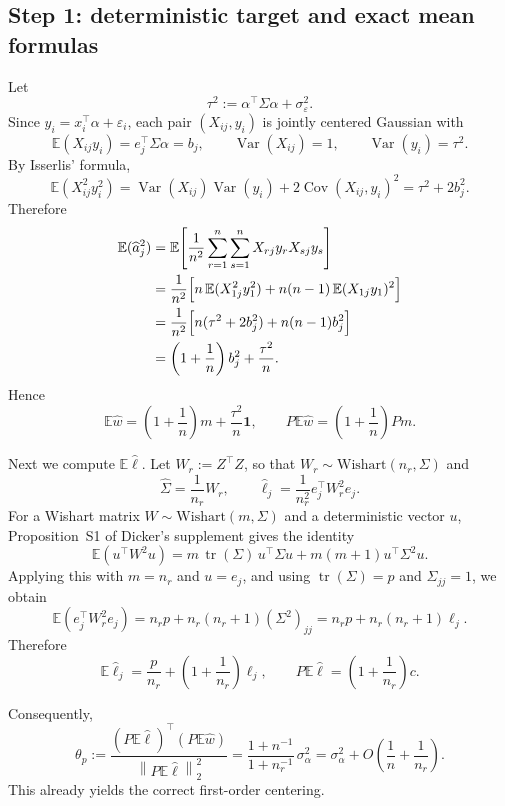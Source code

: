 \documentclass[11pt]{article}
\theoremstyle{definition}
\newcommand{\E}{\mathbb{E}}
\newcommand{\Var}{\operatorname{Var}}
\newcommand{\Cov}{\operatorname{Cov}}
\newcommand{\tr}{\operatorname{tr}}
\newcommand{\1}{\mathbf{1}}
\newcommand{\norm}[1]{\left\lVert #1 \right\rVert}
\begin{document}
\subsection*{Step 1: deterministic target and exact mean formulas}

Let
\[
 \tau^2:=\alpha^\top\Sigma\alpha+\sigma_\varepsilon^2.
\]
Since $y_i=x_i^\top\alpha+\varepsilon_i$, each pair $(X_{ij},y_i)$ is jointly centered Gaussian with
\[
 \E(X_{ij}y_i)=e_j^\top\Sigma\alpha=b_j,
 \qquad
 \Var(X_{ij})=1,
 \qquad
 \Var(y_i)=\tau^2.
\]
By Isserlis' formula,
\[
 \E(X_{ij}^2y_i^2)=\Var(X_{ij})\Var(y_i)+2\Cov(X_{ij},y_i)^2
 =\tau^2+2b_j^2.
\]
Therefore
\begin{align*}
 \E(\widehat a_j^2)
 &=\E\Biggl[\frac1{n^2}\sum_{r=1}^n\sum_{s=1}^n X_{rj}y_rX_{sj}y_s\Biggr] \\
 &=\frac1{n^2}\Bigl[n\,\E(X_{1j}^2y_1^2)+n(n-1)\,\E(X_{1j}y_1)^2\Bigr] \\
 &=\frac1{n^2}\Bigl[n(\tau^2+2b_j^2)+n(n-1)b_j^2\Bigr] \\
 &=\left(1+\frac1n\right)b_j^2+\frac{\tau^2}{n}.
\end{align*}
Hence
\begin{equation}\label{eq:Ew}
 \E\widehat w=\left(1+\frac1n\right)m+\frac{\tau^2}{n}\1,
 \qquad
 P\E\widehat w=\left(1+\frac1n\right)Pm.
\end{equation}

Next we compute $\E\widehat\ell$. Let $W_r:=Z^\top Z$, so that $W_r\sim \mathrm{Wishart}(n_r,\Sigma)$ and
\[
 \widehat\Sigma=\frac1{n_r}W_r,
 \qquad
 \widehat\ell_j=\frac1{n_r^2}e_j^\top W_r^2e_j.
\]
For a Wishart matrix $W\sim\mathrm{Wishart}(m,\Sigma)$ and a deterministic vector $u$, Proposition~S1 of Dicker's supplement gives the identity
\[
 \E(u^\top W^2u)=m\,\tr(\Sigma)\,u^\top\Sigma u+m(m+1)u^\top\Sigma^2u.
\]
Applying this with $m=n_r$ and $u=e_j$, and using $\tr(\Sigma)=p$ and $\Sigma_{jj}=1$, we obtain
\[
 \E(e_j^\top W_r^2e_j)=n_rp+n_r(n_r+1)(\Sigma^2)_{jj}=n_rp+n_r(n_r+1)\ell_j.
\]
Therefore
\begin{equation}\label{eq:El}
 \E\widehat\ell_j=\frac{p}{n_r}+\left(1+\frac1{n_r}\right)\ell_j,
 \qquad
 P\E\widehat\ell=\left(1+\frac1{n_r}\right)c.
\end{equation}

Consequently,
\begin{equation}\label{eq:theta-p}
 \theta_p:=\frac{(P\E\widehat\ell)^\top(P\E\widehat w)}{\norm{P\E\widehat\ell}_2^2}
 =\frac{1+n^{-1}}{1+n_r^{-1}}\,\sigma_\alpha^2
 =\sigma_\alpha^2+O\!\left(\frac1n+\frac1{n_r}\right).
\end{equation}
This already yields the correct first-order centering.
\end{document}

